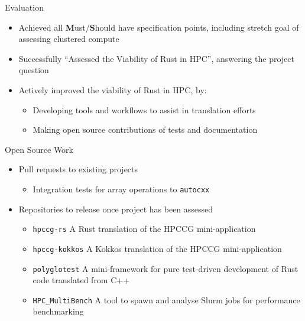 \documentclass[10pt,aspectratio=169]{beamer}
\begin{document}
\begin{frame}{Evaluation}
    \begin{itemize}
        \item Achieved all \textbf{M}ust/\textbf{S}hould have specification points, including stretch goal of assessing clustered compute
        \item Successfully ``Assessed the Viability of Rust in HPC'', answering the project question
        \vspace{0.5cm}
        \item<2-> \alert{Actively improved} the viability of Rust in HPC, by:
        \begin{itemize}
            \item Developing tools and workflows to assist in translation efforts
            \item Making open source contributions of tests and documentation
        \end{itemize}
    \end{itemize}
\end{frame}


\begin{frame}{Open Source Work}
    \begin{itemize}
        \item Pull requests to existing projects
        \begin{itemize}
            \item Integration tests for array operations to \texttt{autocxx}
        \end{itemize}
        \item Repositories to release once project has been assessed
        \begin{itemize}
            \item \texttt{hpccg-rs} A Rust translation of the HPCCG mini-application
            \item \texttt{hpccg-kokkos} A Kokkos translation of the HPCCG mini-application
            \item \texttt{polyglotest} A mini-framework for pure test-driven development of Rust code translated from C++
            \item \texttt{HPC\_MultiBench} A tool to spawn and analyse Slurm jobs for performance benchmarking
        \end{itemize}
    \end{itemize}
\end{frame}
\end{document}
